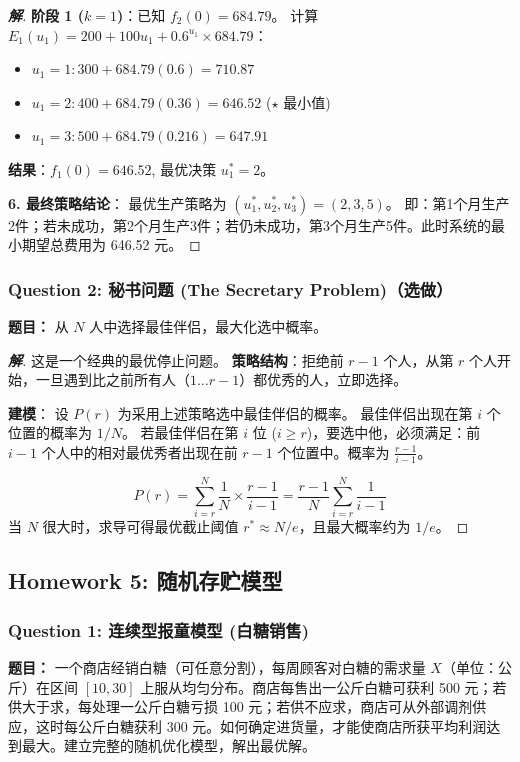\documentclass[a4paper,12pt]{ctexart} %
\newenvironment{solution}{\begin{proof}[\textbf{解}]}{\end{proof}}
\begin{document}
\begin{solution}
		\textbf{阶段 1 ($k=1$)}：已知 $f_2(0)=684.79$。
		计算 $E_1(u_1) = 200 + 100u_1 + 0.6^{u_1} \times 684.79$：
		\begin{itemize}
			\item $u_1=1: 300 + 684.79(0.6) = 710.87$
			\item $u_1=2: 400 + 684.79(0.36) = 646.52$ \quad ($\star$ 最小值)
			\item $u_1=3: 500 + 684.79(0.216) = 647.91$
		\end{itemize}
		\textbf{结果}：$f_1(0) = 646.52$, 最优决策 $u_1^* = 2$。
		
		\textbf{6. 最终策略结论}：
		最优生产策略为 $(u_1^*, u_2^*, u_3^*) = (2, 3, 5)$。
		即：第1个月生产2件；若未成功，第2个月生产3件；若仍未成功，第3个月生产5件。此时系统的最小期望总费用为 646.52 元。
	\end{solution}
	
	\subsubsection*{Question 2: 秘书问题 (The Secretary Problem)（选做）}
	\textbf{题目：} 从 $N$ 人中选择最佳伴侣，最大化选中概率。
	
	\begin{solution}
		这是一个经典的最优停止问题。
		\textbf{策略结构}：拒绝前 $r-1$ 个人，从第 $r$ 个人开始，一旦遇到比之前所有人（$1 \dots r-1$）都优秀的人，立即选择。
		
		\textbf{建模}：
		设 $P(r)$ 为采用上述策略选中最佳伴侣的概率。
		最佳伴侣出现在第 $i$ 个位置的概率为 $1/N$。
		若最佳伴侣在第 $i$ 位 ($i \ge r$)，要选中他，必须满足：前 $i-1$ 个人中的相对最优秀者出现在前 $r-1$ 个位置中。概率为 $\frac{r-1}{i-1}$。
		
		\[ P(r) = \sum_{i=r}^{N} \frac{1}{N} \times \frac{r-1}{i-1} = \frac{r-1}{N} \sum_{i=r}^{N} \frac{1}{i-1} \]
		当 $N$ 很大时，求导可得最优截止阈值 $r^* \approx N/e$，且最大概率约为 $1/e$。
	\end{solution}
	
	\subsection{Homework 5: 随机存贮模型}
	
	\subsubsection*{Question 1: 连续型报童模型 (白糖销售)}
	\textbf{题目：} 一个商店经销白糖（可任意分割），每周顾客对白糖的需求量 $X$（单位：公斤）在区间 $[10, 30]$ 上服从均匀分布。商店每售出一公斤白糖可获利 500 元；若供大于求，每处理一公斤白糖亏损 100 元；若供不应求，商店可从外部调剂供应，这时每公斤白糖获利 300 元。如何确定进货量，才能使商店所获平均利润达到最大。建立完整的随机优化模型，解出最优解。
	
\end{document}
